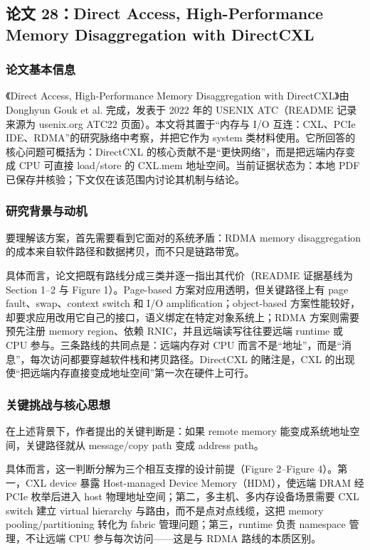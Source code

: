 \documentclass[11pt]{ctexart}
\begin{document}
\subsection{论文 28：Direct Access, High-Performance Memory Disaggregation with DirectCXL}
\subsubsection{论文基本信息}
《Direct Access, High-Performance Memory Disaggregation with DirectCXL》由 Donghyun Gouk et al. 完成，发表于 2022 年的 USENIX ATC（README 记录来源为 usenix.org ATC22 页面）。本文将其置于“内存与 I/O 互连：CXL、PCIe IDE、RDMA”的研究脉络中考察，并把它作为 system 类材料使用。它所回答的核心问题可概括为：DirectCXL 的核心贡献不是“更快网络”，而是把远端内存变成 CPU 可直接 load/store 的 CXL.mem 地址空间。当前证据状态为：本地 PDF 已保存并核验；下文仅在该范围内讨论其机制与结论。\cite{gouk2022directcxl}\par
\subsubsection{研究背景与动机}
要理解该方案，首先需要看到它面对的系统矛盾：RDMA memory disaggregation 的成本来自软件路径和数据拷贝，而不只是链路带宽。\par
具体而言，论文把既有路线分成三类并逐一指出其代价（README 证据基线为 Section 1--2 与 Figure 1）。Page-based 方案对应用透明，但关键路径上有 page fault、swap、context switch 和 I/O amplification；object-based 方案性能较好，却要求应用改用它自己的接口，语义绑定在特定对象系统上；RDMA 方案则需要预先注册 memory region、依赖 RNIC，并且远端读写往往要远端 runtime 或 CPU 参与。三条路线的共同点是：远端内存对 CPU 而言不是“地址”，而是“消息”，每次访问都要穿越软件栈和拷贝路径。DirectCXL 的赌注是，CXL 的出现使“把远端内存直接变成地址空间”第一次在硬件上可行。\par
\subsubsection{关键挑战与核心思想}
在上述背景下，作者提出的关键判断是：如果 remote memory 能变成系统地址空间，关键路径就从 message/copy path 变成 address path。\par
具体而言，这一判断分解为三个相互支撑的设计前提（Figure 2--Figure 4）。第一，CXL device 暴露 Host-managed Device Memory（HDM），使远端 DRAM 经 PCIe 枚举后进入 host 物理地址空间；第二，多主机、多内存设备场景需要 CXL switch 建立 virtual hierarchy 与路由，而不是点对点线缆，这把 memory pooling/partitioning 转化为 fabric 管理问题；第三，runtime 负责 namespace 管理，不让远端 CPU 参与每次访问——这是与 RDMA 路线的本质区别。\par
\end{document}
